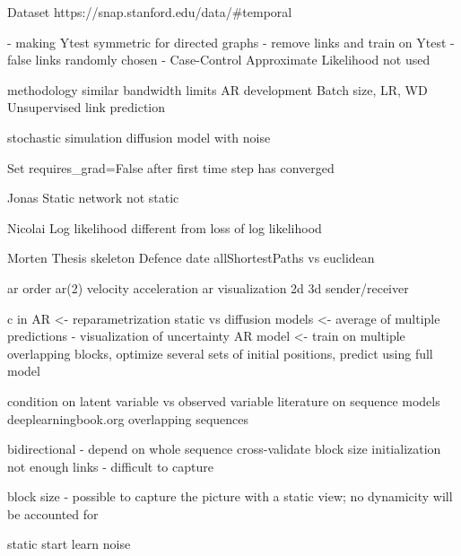 Dataset https://snap.stanford.edu/data/#temporal

- making Ytest symmetric for directed graphs
- remove links and train on Ytest
- false links randomly chosen
- Case-Control Approximate Likelihood not used

methodology similar
bandwidth limits
AR development
Batch size, LR, WD
Unsupervised link prediction

stochastic simulation
diffusion model with noise

Set requires_grad=False after first time step has converged

Jonas
    Static network not static
    
Nicolai
    Log likelihood different from loss of log likelihood
    
Morten
    Thesis skeleton
    Defence date
    allShortestPaths vs euclidean


ar order
ar(2) velocity acceleration
ar visualization 2d 3d sender/receiver

c in AR <- reparametrization
static vs diffusion models <- average of multiple predictions - visualization of uncertainty
AR model <- train on multiple overlapping blocks, optimize several sets of initial positions, predict using full model

condition on latent variable vs observed variable
literature on sequence models deeplearningbook.org
overlapping sequences


bidirectional - depend on whole sequence
cross-validate block size
initialization
not enough links - difficult to capture 

block size - possible to capture the picture with a static view; no dynamicity will be accounted for


static start 
learn noise
